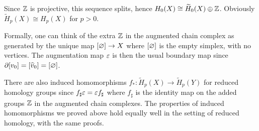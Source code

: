 Since $\mathbb{Z}$ is projective, this sequence splits, hence $H_0(X)\cong \widetilde{H}_0(X)\oplus\mathbb{Z}$. Obviously $\widetilde{H}_p(X)\cong H_p(X)$ for $p>0$.\par
Formally, one can think of the extra $\mathbb{Z}$ in the augmented chain complex as generated by the unique map $[\varnothing]\to X$ where $[\varnothing]$ is the empty simplex, with no vertices. The augmentation map $\varepsilon$ is then the usual boundary map since $\partial[v_0]=[\widehat{v}_0]=[\varnothing]$.\par
There are also induced homomorphisms $f_*:\widetilde{H}_p(X)\to\widetilde{H}_p(Y)$ for reduced homology groups since $f_\sharp\varepsilon=\varepsilon f_\sharp$ where $f_\sharp$ is the identity map on the added groups $\mathbb{Z}$ in the
augmented chain complexes. The properties of induced homomorphisms we proved above hold equally well in the setting of reduced homology, with the same proofs.
